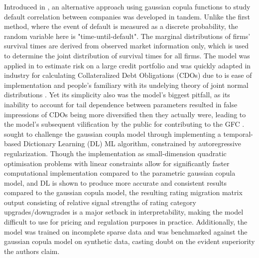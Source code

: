 \documentclass[10pt]{article}
\begin{document}
\begin{multicols*}{2}
Introduced in \citep{li}, an alternative approach using gaussian copula functions to study default correlation between companies was developed in tandem. Unlike the first method, where the event of default is measured as a discrete probability, the random variable here is "time-until-default". The marginal distributions of firms' survival times are derived from observed market information only, which is used to determine the joint distribution of survival times for all firms.
The model was applied in \citep{bourgey} to estimate risk on a large credit portfolio and was quickly adapted in industry for calculating Collateralized Debt Obligations (CDOs) due to is ease of implementation and people's familiary with its undelying theory of joint normal distributions \citep{mackenzie}. Yet its simplicity also was the model's biggest pitfall, as its inability to account for tail dependence between parameters resulted in false impressions of CDOs being more diversified then they actually were, 
leading to the model's subsequent vilification by the public for contributing to the GFC \citep{zimmer}. \citep{allouche} sought to challenge the gaussian coupla model through implementing a temporal-based Dictionary Learning (DL) ML algorithm, constrained by autoregressive regularization. Though the implementation as small-dimension quadratic optimisation problems with linear constraints allow for significantly faster computational implementation compared to the parametric gaussian copula model,
and DL is shown to produce more accurate and consistent results compared to the gaussian copula model, the resulting rating migration matrix output consisting of relative signal strengths of rating category upgrades/downgrades is a major setback in interpretability, making the model difficult to use for pricing and regulation purposes in practice. Additionally, the model was trained on incomplete sparse data and was benchmarked against the gaussian copula model on synthetic data, casting doubt on the evident superiority
the authors claim.


\end{multicols*}
\end{document}
